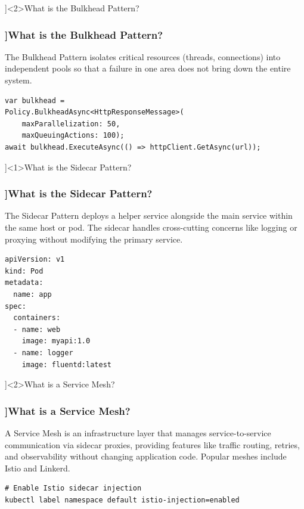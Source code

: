 
\QuestionSlide[\CategoryBadge[MicroColor!20]{Microservices}]<2>{What is the Bulkhead Pattern?}

\begin{frame}[fragile]
  \frametitle{\AnswerTitle[\CategoryBadge[MicroColor!20]{Microservices}]{What is the Bulkhead Pattern?}}

  {\footnotesize
  The Bulkhead Pattern isolates critical resources (threads, connections) into independent pools so that a failure in one area does not bring down the entire system.
  }

  \begin{verbatim}
var bulkhead = 
Policy.BulkheadAsync<HttpResponseMessage>(
    maxParallelization: 50,
    maxQueuingActions: 100);
await bulkhead.ExecuteAsync(() => httpClient.GetAsync(url));
  \end{verbatim}
\end{frame}

\QuestionSlide[\CategoryBadge[MicroColor!20]{Microservices}]<1>{What is the Sidecar Pattern?}

\begin{frame}[fragile]
  \frametitle{\AnswerTitle[\CategoryBadge[MicroColor!20]{Microservices}]{What is the Sidecar Pattern?}}

  {\footnotesize
  The Sidecar Pattern deploys a helper service alongside the main service within the same host or pod. The sidecar handles cross-cutting concerns like logging or proxying without modifying the primary service.
  }

  \begin{verbatim}
apiVersion: v1
kind: Pod
metadata:
  name: app
spec:
  containers:
  - name: web
    image: myapi:1.0
  - name: logger
    image: fluentd:latest
  \end{verbatim}
\end{frame}

\QuestionSlide[\CategoryBadge[MicroColor!20]{Microservices}]<2>{What is a Service Mesh?}

\begin{frame}[fragile]
  \frametitle{\AnswerTitle[\CategoryBadge[MicroColor!20]{Microservices}]{What is a Service Mesh?}}

  {\footnotesize
  A Service Mesh is an infrastructure layer that manages service-to-service communication via sidecar proxies, providing features like traffic routing, retries, and observability without changing application code. Popular meshes include Istio and Linkerd.
  }

  \begin{verbatim}
# Enable Istio sidecar injection
kubectl label namespace default istio-injection=enabled
  \end{verbatim}
\end{frame}

